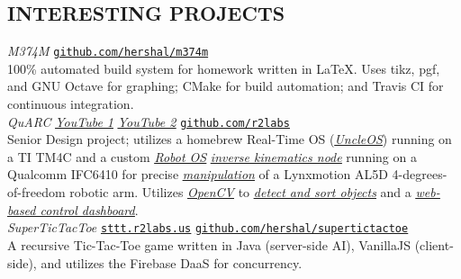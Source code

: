 \documentclass[margin]{res}
\begin{document}
\begin{resume}
  \section{INTERESTING PROJECTS}
  {\sl M374M} \hfill \href{https://github.com/hershal/m374m}
  {\ul{\texttt{github.com/hershal/m374m}}} \\
  100\% automated build system for homework written in \LaTeX{}. Uses tikz, pgf,
  and GNU Octave for graphing; CMake for build automation; and Travis CI for
  continuous integration.
  \vspace{0.5em} \\
  {\sl QuARC} \hfill
  \href{https://www.youtube.com/watch?v=MEig9XBwUmU}{\sl \ul{YouTube 1}}\quad
  \href{https://www.youtube.com/watch?v=MEig9XBwUmU}{\sl \ul{YouTube 2}}\quad
  \href{https://github.com/r2labs}{\ul{\texttt{github.com/r2labs}}} \\
  Senior Design project; utilizes a homebrew Real-Time OS
  (\href{https://github.com/r2labs/uncleos}{\sl \ul{UncleOS}}) running on a
  TI TM4C and a custom \href{http://www.ros.org}{\sl \ul{Robot OS}}
  \href{https://github.com/r2labs/quarc-inverse-kinematics}{\sl \ul{inverse
      kinematics node}} running on a Qualcomm IFC6410 for precise
  \href{https://github.com/r2labs/quarc-user-interface}{\sl
    \ul{manipulation}} of a Lynxmotion AL5D 4-degrees-of-freedom robotic arm. Utilizes
  \href{http://opencv.org}{\sl\ul{OpenCV}} to
  \href{https://github.com/r2labs/quarc-vision}{\sl \ul{detect and sort
      objects}} and a \href{https://github.com/r2labs/quarc-web-interface}{\sl
    \ul{web-based control dashboard}}.
  \vspace{0.5em}\\
  {\sl SuperTicTacToe} \hfill
  \href{http://sttt.r2labs.us}{\ul{\texttt{sttt.r2labs.us}}}\quad
  \href{https://github.com/hershal/supertictactoe}{\ul{\texttt{github.com/hershal/supertictactoe}}} \\
  A recursive Tic-Tac-Toe game written in Java (server-side AI), VanillaJS
  (client-side), and utilizes the Firebase DaaS for concurrency.


\end{resume}
\end{document}
